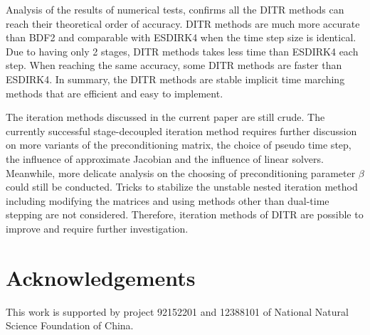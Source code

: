 Analysis of the results of numerical tests, confirms
all the DITR methods can reach their theoretical order of accuracy.
DITR methods are much more accurate than
BDF2 and comparable with ESDIRK4 when the time step size is
identical.
Due to having only 2 stages, DITR methods takes less time than ESDIRK4
each step.
When reaching the same accuracy, some DITR methods are faster than ESDIRK4.
In summary, the DITR methods are stable implicit time marching methods
that are efficient and easy to implement.

The iteration methods discussed in the current paper are still crude.
The currently successful stage-decoupled iteration method
requires further discussion on
more variants of the preconditioning matrix,
the choice of pseudo time step, the influence of approximate
Jacobian and the influence of linear solvers.
Meanwhile, more delicate analysis on the choosing of preconditioning parameter
$\beta$ could still be conducted.
Tricks to stabilize the unstable nested iteration method
including modifying the matrices and
using methods other than dual-time stepping are not considered.
Therefore, iteration methods of DITR are possible to improve and
require further investigation.


\section*{Acknowledgements}
This work is supported by project 92152201 and 12388101 of
National Natural Science Foundation of China.